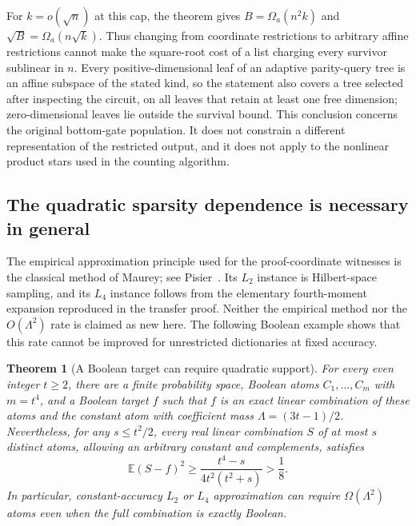 \documentclass[11pt,letterpaper]{article}
\newtheorem{theorem}{Theorem}[section]
\theoremstyle{definition}
\theoremstyle{remark}
\begin{document}
For $k=o(\sqrt n)$ at this cap, the theorem gives
$B=\Omega_a(n^2k)$ and $\sqrt B=\Omega_a(n\sqrt k)$.
Thus changing from coordinate restrictions to arbitrary affine
restrictions cannot make the square-root cost of a list charging every
survivor sublinear in $n$.  Every positive-dimensional leaf of an adaptive
parity-query tree is an affine subspace of the stated kind, so the
statement also covers a tree selected after inspecting the circuit,
on all leaves that retain at least one free dimension;
zero-dimensional leaves lie outside the survival bound.  This conclusion concerns the original
bottom-gate population.  It does not constrain a different representation
of the restricted output, and it does not apply to the nonlinear product
stars used in the counting algorithm.

\subsection{The quadratic sparsity dependence is necessary in general}
\label{lim:sparsity}

The empirical approximation principle used for the proof-coordinate
witnesses is the classical method of Maurey; see Pisier~\cite{Pisier1981}.
Its $L_2$ instance is Hilbert-space sampling, and its $L_4$ instance follows
from the elementary fourth-moment expansion reproduced in the transfer
proof.  Neither the empirical method nor the $O(\Lambda^2)$ rate is claimed
as new here.  The following Boolean example shows that this rate cannot
be improved for unrestricted dictionaries at fixed accuracy.

\begin{theorem}[A Boolean target can require quadratic support]
\label{lim:quadratic-sparsity}
For every even integer $t\ge2$, there are a finite probability space,
Boolean atoms $C_1,\ldots,C_m$ with $m=t^4$, and a Boolean target $f$ such
that $f$ is an exact linear combination of these atoms and the constant
atom with coefficient mass $\Lambda=(3t-1)/2$.  Nevertheless, for any
$s\le t^2/2$, every real linear combination $S$ of at most $s$ distinct
atoms, allowing an arbitrary constant and complements, satisfies
\begin{equation}
 \mathbb E(S-f)^2
 \ge\frac{t^4-s}{4t^2(t^2+s)}>\frac18.
 \label{lim:sparse-lower}
\end{equation}
In particular, constant-accuracy $L_2$ or $L_4$ approximation can require
$\Omega(\Lambda^2)$ atoms even when the full combination is exactly Boolean.
\end{theorem}
\end{document}
